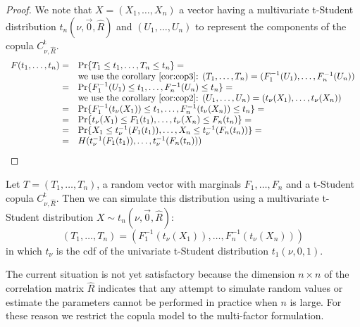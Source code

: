 \documentclass[11pt,fleqn]{book} %
\begin{document}
\begin{proof}
	We note that $X=(X_1,\dots,X_n)$ a vector having a multivariate t-Student
	distribution $t_n(\nu,\vec{0},\widehat{R})$ and $(U_1,\dots,U_n)$ to 
	represent the components of the copula $C_{\nu,\widehat{R}}^{\text{t}}$.
	\begin{displaymath}
		\begin{array}{rl}
			F(t_1,\dots,t_n) = & \Pr\{ T_1 \le t_1 , \dots, T_n \le t_n \} = \\
			                   & \text{we use the corollary~\ref{cor:cop3}: }
			(T_1,\dots,T_n) = (F_1^{-1}(U_1),\dots,F_n^{-1}(U_n)) \\
			=                  & \Pr\{ F_1^{-1}(U_1) \le t_1 , \dots , F_n^{-1}(U_n) \le t_n \} = \\
			                   & \text{we use the corollary~\ref{cor:cop2}: }
			(U_1,\dots,U_n) = (t_\nu(X_1),\dots,t_\nu(X_n)) \\
			=                  & \Pr\{ F_1^{-1}(t_\nu(X_1)) \le t_1 , \dots , F_n^{-1}(t_\nu(X_n)) \le t_n \} = \\
			=                  & \Pr\{ t_\nu(X_1) \le F_1(t_1), \dots , t_\nu(X_n) \le F_n(t_n) \} = \\
			=                  & \Pr\{ X_1 \le t_\nu^{-1}(F_1(t_1)), \dots , X_n \le t_\nu^{-1}(F_n(t_n)) \} = \\
			=                  & H(t_\nu^{-1}(F_1(t_1)), \dots, t_\nu^{-1}(F_n(t_n))) \\
		\end{array}
	\end{displaymath}
\end{proof}

\begin{corollary}
	\label{cor:dts1}
	Let $T=(T_1, \dots, T_n)$, a random vector with marginals 
	$F_1, \dots, F_n$ and a t-Student copula $C_{\nu,\widehat{R}}^{\text{t}}$. 
	Then we can simulate this distribution using a multivariate t-Student 
	distribution $X \sim t_n(\nu,\vec{0},\widehat{R})$:
	\begin{displaymath}
		(T_1, \dots, T_n) = \left(
		F_1^{-1}\left(t_{\nu}(X_1)\right), \dots, F_n^{-1}\left(t_{\nu}(X_n)\right)
		\right)
	\end{displaymath}
	in which $t_\nu$ is the cdf of the univariate t-Student distribution 
	$t_1(\nu,0,1)$.
\end{corollary}

The current situation is not yet satisfactory because the dimension 
$n {\times} n$ of the correlation matrix $\widehat{R}$ indicates that any 
attempt to simulate random values or estimate the parameters cannot be 
performed in practice when $n$ is large. For these reason we restrict the 
copula model to the multi-factor formulation.
\end{document}
